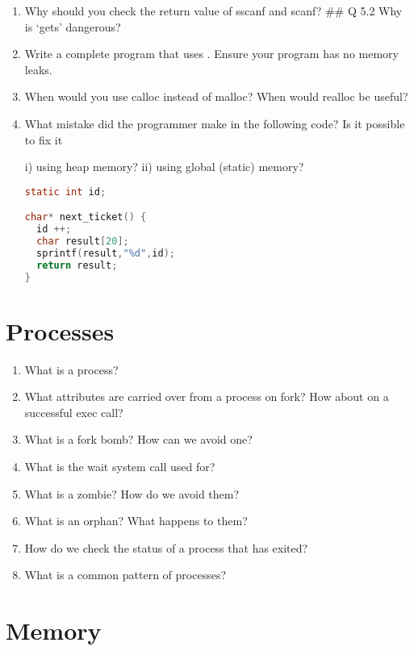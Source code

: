 \begin{enumerate}
\item Why should you check the return value of sscanf and scanf? \#\# Q 5.2 Why is `gets' dangerous?

\item Write a complete program that uses . Ensure your program has no memory leaks.

\item When would you use calloc instead of malloc? When would realloc be useful?

\item What mistake did the programmer make in the following code? Is it possible to fix it

i) using heap memory?
ii) using global (static) memory?

\begin{lstlisting}[language=C]
static int id;

char* next_ticket() {
  id ++;
  char result[20];
  sprintf(result,"%d",id);
  return result;
}
\end{lstlisting}

\end{enumerate}

\section{Processes}

\begin{enumerate}
\item What is a process?
\item What attributes are carried over from a process on fork? How about on a successful exec call?
\item What is a fork bomb? How can we avoid one?
\item What is the wait system call used for?
\item What is a zombie? How do we avoid them?
\item What is an orphan? What happens to them?
\item How do we check the status of a process that has exited?
\item What is a common pattern of processes?
\end{enumerate}

\section{Memory}

